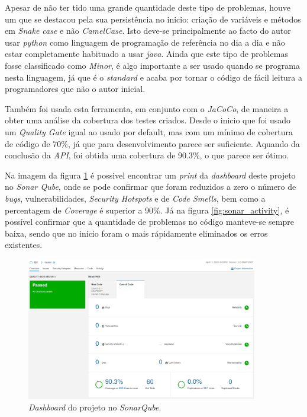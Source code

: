 Apesar de não ter tido uma grande quantidade deste tipo de problemas, houve um que se destacou pela sua persistência no inicio: criação de variáveis e métodos em \textit{Snake case} e não \textit{CamelCase}. Isto deve-se principalmente ao facto do autor usar \textit{python} como linguagem de programação de referência no dia a dia e não estar completamente habituado a usar \textit{java}. Ainda que este tipo de problemas fosse classificado como \textit{Minor}, é algo importante a ser usado quando se programa nesta linguagem, já que é o \textit{standard} e acaba por tornar o código de fácil leitura a programadores que não o autor inicial.

Também foi usada esta ferramenta, em conjunto com o \textit{JaCoCo}, de maneira a obter uma análise da cobertura dos testes criados. Desde o inicio que foi usado um \textit{Quality Gate} igual ao usado por default, mas com um mínimo de cobertura de código de 70\%, já que para desenvolvimento parece ser suficiente. Aquando da conclusão da \textit{API}, foi obtida uma cobertura de 90.3\%, o que parece ser ótimo.

Na imagem da figura \ref{fig:sonar} é possivel encontrar um \textit{print} da \textit{dashboard} deste projeto no 
\textit{Sonar Qube}, onde se pode confirmar que foram reduzidos a zero o número de \textit{bugs}, vulnerabilidades, \textit{Security Hotspots} e de \textit{Code Smells}, bem como a percentagem de \textit{Coverage} é superior a 90\%. Já na figura \ref{fig:sonar_activity}, é possível confirmar que a quantidade de problemas no código manteve-se sempre baixa, sendo que no inicio foram o mais rápidamente eliminados os erros existentes.

\begin{figure}[h]
   \centering
   \includegraphics[width=0.90\textwidth]{images/sonar}
   \caption{\textit{Dashboard} do projeto no \textit{SonarQube}.}
   \label{fig:sonar}
\end{figure}

